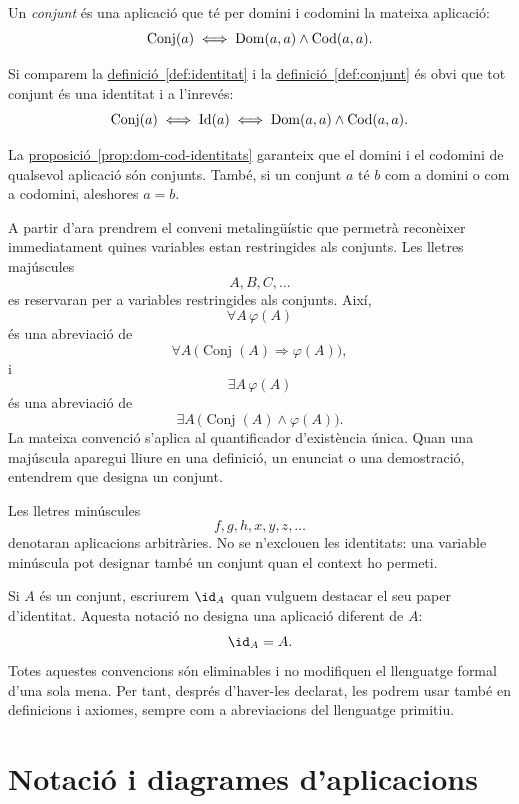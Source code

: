 \begin{definicio}[Conjunt]\label{def:conjunt}
Un \emph{conjunt} és una aplicació que té per domini i codomini la mateixa aplicació:
\[
\operatorname{Conj}(a)
\iff
\operatorname{Dom}(a,a)\land \operatorname{Cod}(a,a).
\]
\end{definicio}

Si comparem la \hyperref[def:identitat]{definició~\ref*{def:identitat}} i la \hyperref[def:conjunt]{definició~\ref*{def:conjunt}} és obvi que tot conjunt és una identitat i a l'inrevés:
\[
\operatorname{Conj}(a)
\iff
\operatorname{Id}(a)
\iff
\operatorname{Dom}(a,a)\land \operatorname{Cod}(a,a).
\]

La \hyperref[prop:dom-cod-identitats]{proposició~\ref*{prop:dom-cod-identitats}} garanteix que el domini i el codomini de qualsevol aplicació són conjunts. També, si un conjunt \(a\) té \(b\) com a domini o com a codomini, aleshores \(a=b\).

\begin{notacio}\label{not:variables-conjunts-aplicacions}
A partir d'ara prendrem el conveni metalingüístic que permetrà reconèixer immediatament quines variables estan restringides als conjunts. Les lletres majúscules
\[
A,B,C,\ldots
\]
es reservaran per a variables restringides als conjunts. Així,
\[
\forall A\,\varphi(A)
\]
és una abreviació de
\[
\forall A\,\bigl(\operatorname{Conj}(A)\Rightarrow\varphi(A)\bigr),
\]
i
\[
\exists A\,\varphi(A)
\]
és una abreviació de
\[
\exists A\,\bigl(\operatorname{Conj}(A)\land\varphi(A)\bigr).
\]
La mateixa convenció s'aplica al quantificador d'existència única. Quan una majúscula aparegui lliure en una definició, un enunciat o una demostració, entendrem que designa un conjunt.

\bigskip

Les lletres minúscules
\[
f,g,h,x,y,z,\ldots
\]
denotaran aplicacions arbitràries. No se n'exclouen les identitats: una variable minúscula pot designar també un conjunt quan el context ho permeti.

Si \(A\) és un conjunt, escriurem \(\id_A\) quan vulguem destacar el seu paper d'identitat. Aquesta notació no designa una aplicació diferent de \(A\):
\[
\id_A=A.
\]
Totes aquestes convencions són eliminables i no modifiquen el llenguatge formal d'una sola mena. Per tant, després d'haver-les declarat, les podrem usar també en definicions i axiomes, sempre com a abreviacions del llenguatge primitiu.
\end{notacio}

\section{Notació i diagrames d'aplicacions}\label{sec:diagrames-aplicacions}

